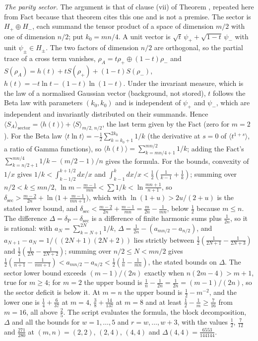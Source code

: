 \emph{The parity sector.} The argument is that of clause (vii) of Theorem , repeated here from Fact  because that theorem cites this one and is not a premise. The sector is $H_{+} \oplus H_{-}$, each summand the tensor product of a space of dimension $m/2$ with one of dimension $n/2$; put $k_{0} = mn/4$. A unit vector is $\sqrt{t}\,\psi_{+} + \sqrt{1-t}\,\psi_{-}$ with unit $\psi_{\pm} \in H_{\pm}$. The two factors of dimension $n/2$ are orthogonal, so the partial trace of a cross term vanishes, $\rho_{A} = t\rho_{+} \oplus (1-t)\rho_{-}$ and $S(\rho_{A}) = h(t) + tS(\rho_{+}) + (1-t)S(\rho_{-})$, $h(t) = -t\ln t - (1-t)\ln(1-t)$. Under the invariant measure, which is the law of a normalised Gaussian vector (background, not stored), $t$ follows the Beta law with parameters $(k_{0}, k_{0})$ and is independent of $\psi_{+}$ and $\psi_{-}$, which are independent and invariantly distributed on their summands. Hence $\langle S_{A}\rangle_{\mathrm{sector}} = \langle h(t)\rangle + \langle S\rangle_{m/2,\,n/2}$, the last term given by the Fact (zero for $m = 2$). For the Beta law $\langle t\ln t\rangle = -\tfrac12\sum_{k=k_{0}+1}^{2k_{0}}1/k$ (the derivative at $s = 0$ of $\langle t^{1+s}\rangle$, a ratio of Gamma functions), so $\langle h(t)\rangle = \sum_{k=mn/4+1}^{mn/2}1/k$; adding the Fact's $\sum_{k=n/2+1}^{mn/4}1/k - (m/2 - 1)/n$ gives the formula. For the bounds, convexity of $1/x$ gives $1/k < \int_{k-1/2}^{k+1/2}dx/x$ and $\int_{k-1}^{k}dx/x < \tfrac12(\tfrac{1}{k-1} + \tfrac1k)$; summing over $n/2 < k \le mn/2$, $\ln m - \tfrac{m-1}{mn} < \sum 1/k < \ln\tfrac{mn+1}{n+1}$, so $\delta_{\mathrm{sec}} > \tfrac{m-2}{2n} + \ln\bigl(1 + \tfrac{m-1}{mn+1}\bigr)$, which with $\ln(1+u) > 2u/(2+u)$ is the stated lower bound, and $\delta_{\mathrm{sec}} < \tfrac{m-2}{2n} + \tfrac{m-1}{mn} = \tfrac{m}{2n} - \tfrac{1}{mn}$, below $\tfrac12$ because $m \le n$. The difference $\Delta = \delta_{\mathrm{P}} - \delta_{\mathrm{sec}}$ is a difference of finite harmonic sums plus $\tfrac{1}{2n}$, so it is rational: with $a_{N} = \sum_{k=N+1}^{2N}1/k$, $\Delta = \tfrac{1}{2n} - (a_{mn/2} - a_{n/2})$, and $a_{N+1} - a_{N} = 1/((2N+1)(2N+2))$ lies strictly between $\tfrac12(\tfrac{1}{2N+1} - \tfrac{1}{2N+3})$ and $\tfrac12(\tfrac{1}{2N} - \tfrac{1}{2N+2})$; summing over $n/2 \le N < mn/2$ gives $\tfrac12(\tfrac{1}{n+1} - \tfrac{1}{mn+1}) < a_{mn/2} - a_{n/2} < \tfrac12(\tfrac1n - \tfrac{1}{mn})$, the stated bounds on $\Delta$. The sector lower bound exceeds $(m-1)/(2n)$ exactly when $n(2m - 4) > m + 1$, true for $m \ge 4$; for $m = 2$ the upper bound is $\tfrac1n - \tfrac{1}{2n} = \tfrac{1}{2n} = (m-1)/(2n)$, so the sector deficit is below it. At $m = n$ the upper bound is $\tfrac12 - m^{-2}$, and the lower one is $\tfrac14 + \tfrac{6}{37}$ at $m = 4$, $\tfrac38 + \tfrac{14}{137}$ at $m = 8$ and at least $\tfrac12 - \tfrac1m \ge \tfrac{7}{16}$ from $m = 16$, all above $\tfrac25$. The script evaluates the formula, the block decomposition, $\Delta$ and all the bounds for $w = 1, \ldots, 5$ and $r = w, \ldots, w + 3$, with the values $\tfrac12$, $\tfrac{7}{12}$ and $\tfrac{271}{280}$ at $(m, n) = (2, 2)$, $(2, 4)$, $(4, 4)$ and $\Delta(4, 4) = \tfrac{6553}{144144}$.

